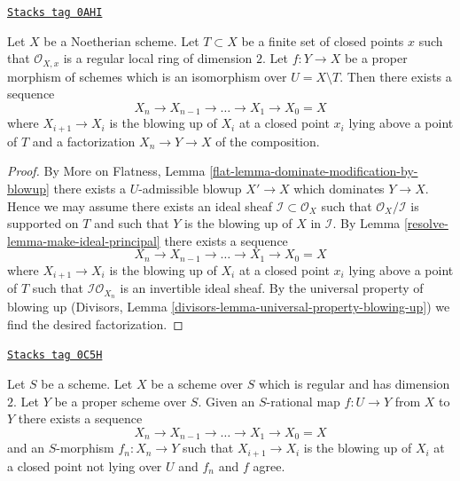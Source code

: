 \begin{lemma}
\label{resolve-lemma-dominate-by-blowing-up-in-points}
\href{https://stacks.math.columbia.edu/tag/0AHI}{\texttt{Stacks tag 0AHI}}

Let $X$ be a Noetherian scheme. Let $T \subset X$ be a finite set of
closed points $x$ such that $\mathcal{O}_{X, x}$ is a regular local
ring of dimension $2$. Let $f : Y \to X$ be a proper morphism of
schemes which is an isomorphism over $U = X \setminus T$.
Then there exists a sequence
$$
X_n \to X_{n - 1} \to \ldots \to X_1 \to X_0 = X
$$
where $X_{i + 1} \to X_i$ is the blowing up of $X_i$ at a closed
point $x_i$ lying above a point of $T$ and a factorization $X_n \to Y \to X$
of the composition.
\end{lemma}

\begin{proof}

By More on Flatness, Lemma \ref{flat-lemma-dominate-modification-by-blowup}
there exists a $U$-admissible blowup $X' \to X$ which dominates
$Y \to X$. Hence we may assume there exists an ideal sheaf
$\mathcal{I} \subset \mathcal{O}_X$ such that
$\mathcal{O}_X/\mathcal{I}$ is supported on $T$ and such that
$Y$ is the blowing up of $X$ in $\mathcal{I}$.
By Lemma \ref{resolve-lemma-make-ideal-principal}
there exists a sequence
$$
X_n \to X_{n - 1} \to \ldots \to X_1 \to X_0 = X
$$
where $X_{i + 1} \to X_i$ is the blowing up of $X_i$ at a closed
point $x_i$ lying above a point of $T$ such that
$\mathcal{I}\mathcal{O}_{X_n}$ is an invertible ideal sheaf.
By the universal property of blowing up
(Divisors, Lemma
\ref{divisors-lemma-universal-property-blowing-up})
we find the desired factorization.
\end{proof}

\begin{lemma}
\label{resolve-lemma-extend-rational-map-blowing-up}
\href{https://stacks.math.columbia.edu/tag/0C5H}{\texttt{Stacks tag 0C5H}}

Let $S$ be a scheme. Let $X$ be a scheme over $S$ which is
regular and has dimension $2$. Let $Y$ be a proper
scheme over $S$. Given an $S$-rational map $f : U \to Y$ from
$X$ to $Y$ there exists a sequence
$$
X_n \to X_{n - 1} \to \ldots \to X_1 \to X_0 = X
$$
and an $S$-morphism $f_n : X_n \to Y$ such that $X_{i + 1} \to X_i$
is the blowing up of $X_i$ at a closed point not lying over $U$
and $f_n$ and $f$ agree.
\end{lemma}


